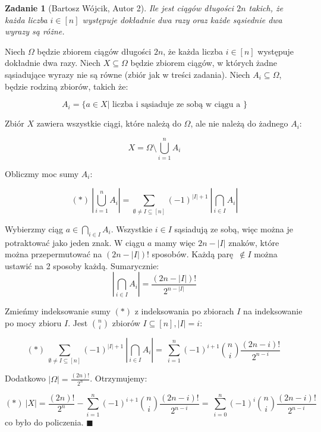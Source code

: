 \documentclass{mwart}
\newtheorem{zad}{Zadanie}[section]
\begin{document}
\begin{zad}[Bartosz Wójcik, Autor 2]
    Ile jest ciągów długości $2n$ takich, że każda liczba $i \in [n]$
    występuje dokładnie dwa razy oraz każde sąsiednie dwa wyrazy są różne.
\end{zad}

\begin{mdframed}

    Niech $\Omega$ będzie zbiorem ciągów długości $2n$, że każda liczba $i \in [n]$
    występuje dokładnie dwa razy.
    Niech $X \subseteq \Omega$ będzie zbiorem ciągów, w których żadne sąsiadujące wyrazy
    nie są równe (zbiór jak w treści zadania).
    Niech $A_i \subseteq \Omega$, będzie rodziną zbiorów,
    takich że:

    $$ A_i = \{a \in X \vert\text{ liczba i sąsiaduje ze sobą w ciągu a }\} $$

    Zbiór $X$ zawiera wszystkie ciągi, które należą do $\Omega$, ale nie należą do żadnego
    $A_i$:

    $$ X = \Omega \setminus \bigcup_{i = 1}^{n} A_i$$

    Obliczmy moc sumy $A_i$:

    $$ (*) \
        |\bigcup_{i = 1}^{n} A_i| = \sum_{\emptyset\neq I \subseteq [n]} (-1)^{|I| + 1} \
        |\bigcap_{i \in I} A_i|
    $$

    Wybierzmy ciąg $a \in \bigcap_{i \in I} A_i$. Wszystkie $i \in I$ sąsiadują ze sobą,
    więc można je potraktować jako jeden znak. W ciągu $a$ mamy więc $2n - |I|$ znaków,
    które można przepermutować na $(2n - |I|)!$ sposobów. Każdą parę $\notin I$ można ustawić na 2
    sposoby każdą. Sumarycznie:
    $$\
        |\bigcap_{i \in I} A_i| = \frac{(2n - |I|)!}{2^{n - |I|}}\
    $$

    Zmieńmy indeksowanie sumy $(*)$ z indeksowania po zbiorach $I$ na indeksowanie po mocy zbioru $I$.
    Jest $\binom{n}{i}$ zbiorów $I \subseteq [n], |I| = i$:

    $$(*)\
        \sum_{\emptyset\neq I \subseteq [n]} (-1)^{|I| + 1} \
        |\bigcap_{i \in I} A_i| = \
        \sum_{i = 1}^{n} (-1)^{i + 1} \binom{n}{i} \frac{(2n - i)!}{2^{n - i}}\
    $$

    Dodatkowo $|\Omega| = \frac{(2n)!}{2^{n}}$. Otrzymujemy:

    $$(*)\
        |X| = \frac{(2n)!}{2^{n}} - \sum_{i = 1}^{n} (-1)^{i + 1} \binom{n}{i} \frac{(2n - i)!}{2^{n - i}} = \
        \sum_{i = 0}^{n} (-1)^{i} \binom{n}{i} \frac{(2n - i)!}{2^{n - i}} \
    $$
    co było do policzenia. $\blacksquare$


\end{mdframed}
\end{document}
